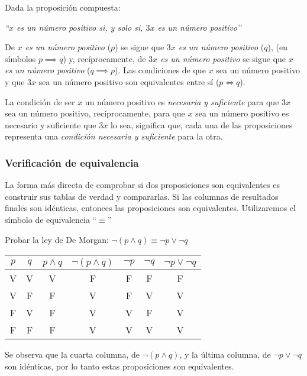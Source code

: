 \begin{fmd-example}
	Dada la proposición compuesta:
	\begin{center}
		\emph{``$x$ es un número positivo si, y solo si, $3x$ es un número positivo''}
	\end{center}
	
	De \textit{$x$ es un número positivo} ($p$) se sigue que \textit{$3x$ es un número positivo} ($q$), (en símbolos $p \implies q$) y, recíprocamente, de \textit{$3x$ es un número positivo} se sigue que \textit{$x$ es un número positivo} ($q \implies p$). Las condiciones de que $x$ sea un número positivo y que $3x$ sea un número positivo son equivalentes entre sí ($p \iff q$).
	
	La condición de ser $x$ un número positivo es \textit{necesaria y suficiente} para que $3x$ sea un número positivo, recíprocamente, para que $x$ sea un número positivo es necesario y suficiente que $3x$ lo sea, significa que, cada una de las proposiciones representa una \textit{condición necesaria y suficiente} para la otra.
\end{fmd-example}

\subsubsection{Verificación de equivalencia}

La forma más directa de comprobar si dos proposiciones son equivalentes es construir sus tablas de verdad y compararlas. Si las columnas de resultados finales son idénticas, entonces las proposiciones son equivalentes. Utilizaremos el símbolo de equivalencia ``$\equiv$''

\begin{fmd-example}
	Probar la ley de De Morgan: \( \neg \left(p \land q \right) \equiv \neg p \lor \neg q \)
	\begin{table}[H]
		\centering
		\begin{tabular}{|c|c|c|c|c|c|c|}
			\hline
			$p$ & $q$ & $p \land q$ & $\neg (p \land q)$ & $\neg p$ & $\neg q$ & $\neg p \lor \neg q$ \\
			\hline
			V & V & V & F & F & F & F \\
			V & F & F & V & F & V & V \\
			F & V & F & V & V & F & V \\
			F & F & F & V & V & V & V \\
			\hline
		\end{tabular}
	\end{table}
	Se observa que la cuarta columna, de $\neg \left(p \land q \right)$, y la última columna, de \( \neg p \lor \neg q \) son idénticas, por lo tanto estas proposiciones son equivalentes.
\end{fmd-example}

